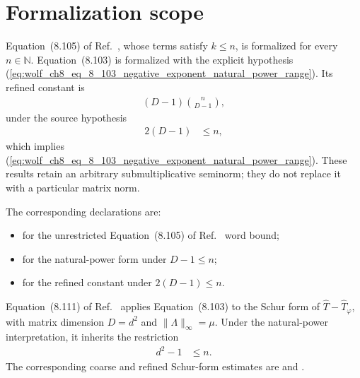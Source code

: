 \documentclass{article}
\begin{document}
\section{Formalization scope}

Equation~(8.105) of Ref.~\cite{Wolf2012Quantum}, whose terms satisfy
$k\leq n$, is formalized for every $n\in\mathbb N$. Equation~(8.103) is
formalized with the explicit hypothesis
(\ref{eq:wolf_ch8_eq_8_103_negative_exponent_natural_power_range}). Its
refined constant is
\begin{align}
    (D-1)\binom{n}{D-1},
    \label{eq:wolf_ch8_eq_8_103_negative_exponent_refined_constant}
\end{align}
under the source hypothesis
\begin{align}
    2(D-1)
        &\leq n,
    \label{eq:wolf_ch8_eq_8_103_negative_exponent_refined_range}
\end{align}
which implies
(\ref{eq:wolf_ch8_eq_8_103_negative_exponent_natural_power_range}). These
results retain an arbitrary submultiplicative seminorm; they do not replace it
with a particular matrix norm.

The corresponding declarations are:
\begin{itemize}
    \item {} for the unrestricted
        Equation~(8.105) of Ref.~\cite{Wolf2012Quantum} word bound;

    \item {} for the natural-power form under
        $D-1\leq n$;

    \item {} for the refined constant under
        $2(D-1)\leq n$.
\end{itemize}

Equation~(8.111) of Ref.~\cite{Wolf2012Quantum} applies Equation~(8.103) to
the Schur form of $\widehat T-\widehat T_\varphi$, with matrix dimension
$D=d^2$ and $\lVert\Lambda\rVert_\infty=\mu$. Under the natural-power
interpretation, it inherits the restriction
\begin{align}
    d^2-1
        &\leq n.
    \label{eq:wolf_ch8_eq_8_103_negative_exponent_channel_coarse_range}
\end{align}
The corresponding coarse and refined Schur-form estimates are
 and
.
\end{document}

